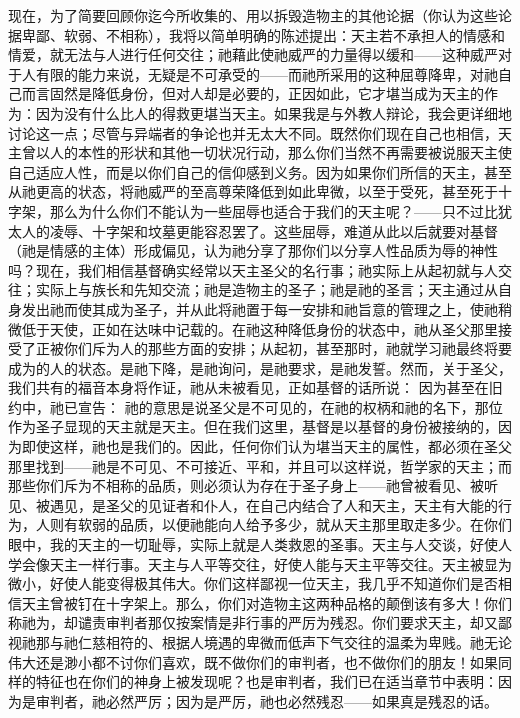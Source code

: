 现在，为了简要回顾你迄今所收集的、用以拆毁造物主的其他论据（你认为这些论据卑鄙、软弱、不相称），我将以简单明确的陈述提出：天主若不承担人的情感和情爱，就无法与人进行任何交往；祂藉此使祂威严的力量得以缓和——这种威严对于人有限的能力来说，无疑是不可承受的——而祂所采用的这种屈尊降卑，对祂自己而言固然是降低身份，但对人却是必要的，正因如此，它才堪当成为天主的作为：因为没有什么比人的得救更堪当天主。如果我是与外教人辩论，我会更详细地讨论这一点；尽管与异端者的争论也并无太大不同。既然你们现在自己也相信，天主曾以人的本性的形状和其他一切状况行动，那么你们当然不再需要被说服天主使自己适应人性，而是以你们自己的信仰感到义务。因为如果你们所信的天主，甚至从祂更高的状态，将祂威严的至高尊荣降低到如此卑微，以至于受死，甚至死于十字架，那么为什么你们不能认为一些屈辱也适合于我们的天主呢？——只不过比犹太人的凌辱、十字架和坟墓更能容忍罢了。这些屈辱，难道从此以后就要对基督（祂是情感的主体）形成偏见，认为祂分享了那你们以分享人性品质为辱的神性吗？现在，我们相信基督确实经常以天主圣父的名行事；祂实际上从起初就与人交往；实际上与族长和先知交流；祂是造物主的圣子；祂是祂的圣言；天主通过从自身发出祂而使其成为圣子，并从此将祂置于每一安排和祂旨意的管理之上，使祂稍微低于天使，正如在达味中记载的。在祂这种降低身份的状态中，祂从圣父那里接受了正被你们斥为人的那些方面的安排；从起初，甚至那时，祂就学习祂最终将要成为的人的状态。是祂下降，是祂询问，是祂要求，是祂发誓。然而，关于圣父，我们共有的福音本身将作证，祂从未被看见，正如基督的话所说： 因为甚至在旧约中，祂已宣告： 祂的意思是说圣父是不可见的，在祂的权柄和祂的名下，那位作为圣子显现的天主就是天主。但在我们这里，基督是以基督的身份被接纳的，因为即使这样，祂也是我们的。因此，任何你们认为堪当天主的属性，都必须在圣父那里找到——祂是不可见、不可接近、平和，并且可以这样说，哲学家的天主；而那些你们斥为不相称的品质，则必须认为存在于圣子身上——祂曾被看见、被听见、被遇见，是圣父的见证者和仆人，在自己内结合了人和天主，天主有大能的行为，人则有软弱的品质，以便祂能向人给予多少，就从天主那里取走多少。在你们眼中，我的天主的一切耻辱，实际上就是人类救恩的圣事。天主与人交谈，好使人学会像天主一样行事。天主与人平等交往，好使人能与天主平等交往。天主被显为微小，好使人能变得极其伟大。你们这样鄙视一位天主，我几乎不知道你们是否相信天主曾被钉在十字架上。那么，你们对造物主这两种品格的颠倒该有多大！你们称祂为，却谴责审判者那仅按案情是非行事的严厉为残忍。你们要求天主，却又鄙视祂那与祂仁慈相符的、根据人境遇的卑微而低声下气交往的温柔为卑贱。祂无论伟大还是渺小都不讨你们喜欢，既不做你们的审判者，也不做你们的朋友！如果同样的特征也在你们的神身上被发现呢？也是审判者，我们已在适当章节中表明：因为是审判者，祂必然严厉；因为是严厉，祂也必然残忍——如果真是残忍的话。\par

